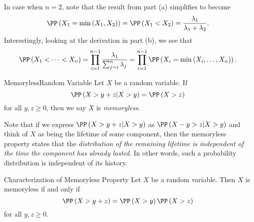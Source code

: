\documentclass[stat333]{subfiles}
\begin{document}
    \noindent In case when $n=2$, note that the result from part (a) simplifies to become
    \begin{equation*}
        \PP\left( X_1=\min\left( X_1,X_2 \right) \right) = \PP\left( X_1<X_2 \right) = \frac{\lambda_1}{\lambda_1+\lambda_2}.
    \end{equation*}
    Interestingly, looking at the derivation in part (b), we see that
    \begin{equation*}
        \PP\left( X_1<\cdots<X_n \right) = \prod^{n-1}_{i=1} \frac{\lambda_1}{\sum^{n}_{j=i}\lambda_j} = \prod^{n-1}_{i=1}\PP\left( X_i=\min\left( X_i,\ldots,X_n \right) \right).
    \end{equation*}

    \begin{definition}{Memoryless}{Random Variable}
        Let $X$ be a random variable. If
        \begin{equation*}
            \PP\left( X>y+z|X>y \right) = \PP\left( X>z \right)
        \end{equation*}
        for all $y,z\geq 0$, then we say $X$ is \emph{memoryless}.
    \end{definition}

    Note that if we express $\PP\left( X>y+z|X>y \right)$ as $\PP\left( X-y>z|X>y \right)$ and think of $X$ as being the lifetime of some component, then the memoryless property states that the \textit{distribution of the remaining lifetime is independent of the time the component has already lasted}. In other words, such a probability distribution is independent of its history.

    \begin{prop}{Characterization of Memoryless Property}
        Let $X$ be a random variable. Then $X$ is memoryless if and only if
        \begin{equation*}
            \PP\left( X>y+z \right) = \PP\left( X>y \right)\PP\left( X>z \right)
        \end{equation*}
        for all $y,z\geq 0$.
    \end{prop}
\end{document}

